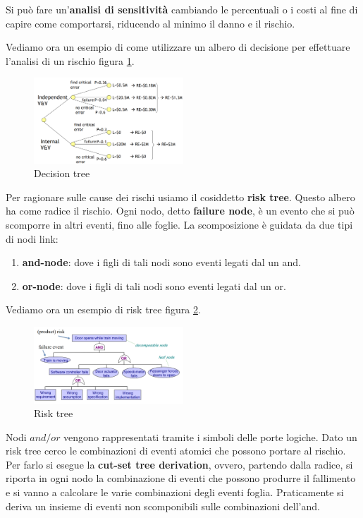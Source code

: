 Si può fare un'\textbf{analisi di sensitività}
cambiando le percentuali o i costi al fine di capire come comportarsi, riducendo
al minimo il danno e il rischio.

\begin{esempio}
    Vediamo ora un esempio di come utilizzare un albero di decisione per effettuare
    l'analisi di un rischio figura \ref{fig:tree}.
    \begin{figure}[!ht]
        \centering
        \includegraphics[width=0.5\textwidth]{img/risk/tree.png}
        \caption{Decision tree}
        \label{fig:tree}
    \end{figure}
\end{esempio}

Per ragionare sulle cause dei rischi usiamo il cosiddetto \textbf{risk tree}. Questo
albero ha come radice il rischio. Ogni nodo, detto \textbf{failure node}, è un
evento che si può scomporre in altri eventi, fino alle foglie. La scomposizione
è guidata da due tipi di nodi link:
\begin{enumerate}
    \item \textbf{and-node}: dove i figli di tali nodi sono eventi legati dal un
          and.
    \item \textbf{or-node}: dove i figli di tali nodi sono eventi legati dal un
          or.
\end{enumerate}
\begin{esempio}
    Vediamo ora un esempio di risk tree figura \ref{fig:risk-tree}.
    \begin{figure}[!ht]
        \centering
        \includegraphics[width=0.5\textwidth]{img/risk/risktree.png}
        \caption{Risk tree}
        \label{fig:risk-tree}
    \end{figure}
\end{esempio}
Nodi $and/or$ vengono rappresentati tramite i simboli delle porte logiche. Dato un
risk tree cerco le combinazioni di eventi atomici che possono portare al rischio.
Per farlo si esegue la \textbf{cut-set tree derivation}, ovvero, partendo dalla radice, si
riporta in ogni nodo la combinazione di eventi che possono produrre il fallimento
e si vanno a calcolare le varie combinazioni degli eventi foglia. Praticamente si
deriva un insieme di eventi non scomponibili sulle combinazioni dell'and.

